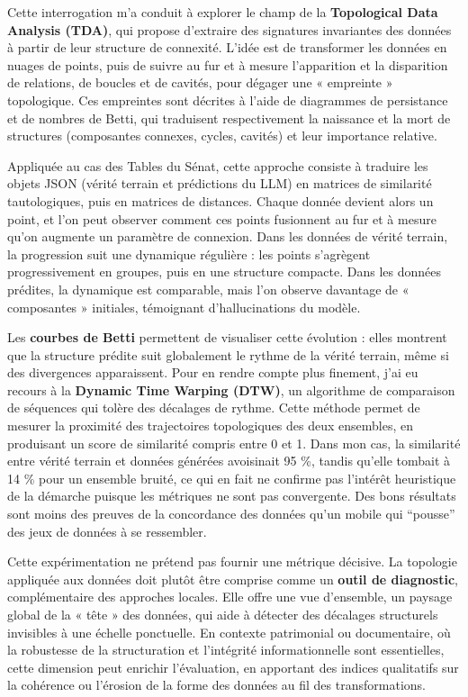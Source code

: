 Cette interrogation m’a conduit à explorer le champ de la \textbf{Topological Data Analysis (TDA)}, qui propose d’extraire des signatures invariantes des données à partir de leur structure de connexité. L’idée est de transformer les données en nuages de points, puis de suivre au fur et à mesure l’apparition et la disparition de relations, de boucles et de cavités, pour dégager une « empreinte » topologique. Ces empreintes sont décrites à l’aide de diagrammes de persistance et de nombres de Betti, qui traduisent respectivement la naissance et la mort de structures (composantes connexes, cycles, cavités) et leur importance relative.

Appliquée au cas des Tables du Sénat, cette approche consiste à traduire les objets JSON (vérité terrain et prédictions du LLM) en matrices de similarité tautologiques, puis en matrices de distances. Chaque donnée devient alors un point, et l’on peut observer comment ces points fusionnent au fur et à mesure qu’on augmente un paramètre de connexion. Dans les données de vérité terrain, la progression suit une dynamique régulière : les points s’agrègent progressivement en groupes, puis en une structure compacte. Dans les données prédites, la dynamique est comparable, mais l’on observe davantage de « composantes » initiales, témoignant d’hallucinations du modèle.

Les \textbf{courbes de Betti} permettent de visualiser cette évolution : elles montrent que la structure prédite suit globalement le rythme de la vérité terrain, même si des divergences apparaissent. Pour en rendre compte plus finement, j’ai eu recours à la \textbf{Dynamic Time Warping (DTW)}, un algorithme de comparaison de séquences qui tolère des décalages de rythme. Cette méthode permet de mesurer la proximité des trajectoires topologiques des deux ensembles, en produisant un score de similarité compris entre 0 et 1. Dans mon cas, la similarité entre vérité terrain et données générées avoisinait 95 \%, tandis qu’elle tombait à 14 \% pour un ensemble bruité, ce qui en fait ne confirme pas l’intérêt heuristique de la démarche puisque les métriques ne sont pas convergente. Des bons résultats sont moins des preuves de la concordance des données qu'un mobile qui \enquote{pousse} des jeux de données à se ressembler.

Cette expérimentation ne prétend pas fournir une métrique décisive. La topologie appliquée aux données doit plutôt être comprise comme un \textbf{outil de diagnostic}, complémentaire des approches locales. Elle offre une vue d’ensemble, un paysage global de la « tête » des données, qui aide à détecter des décalages structurels invisibles à une échelle ponctuelle. En contexte patrimonial ou documentaire, où la robustesse de la structuration et l’intégrité informationnelle sont essentielles, cette dimension peut enrichir l’évaluation, en apportant des indices qualitatifs sur la cohérence ou l’érosion de la forme des données au fil des transformations.

